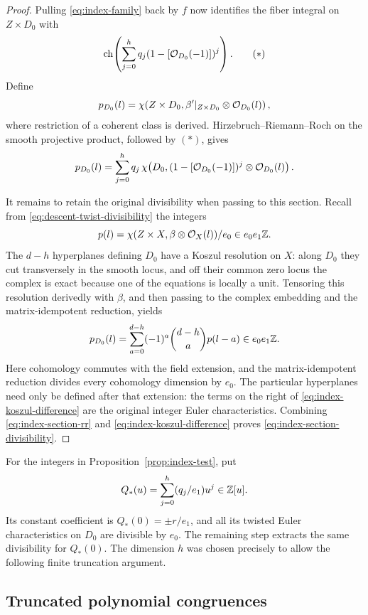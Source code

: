 \begin{proof}
Pulling \eqref{eq:index-family} back by \(f\) now identifies
the fiber integral on \(Z\times D_0\) with
\[
 \operatorname{ch}\!\left(
       \sum_{j=0}^h q_j(1-[\mathcal O_{D_0}(-1)])^j
     \right).
 \tag{\(\ast\)}
\]
Define
\[
 p_{D_0}(l)=
 \chi\!\left(Z\times D_0,
       \beta'|_{Z\times D_0}\otimes\mathcal O_{D_0}(l)\right),
\]
where restriction of a coherent class is derived.
Hirzebruch--Riemann--Roch on the smooth projective product, followed
by \((\ast)\), gives
\begin{equation}\label{eq:index-section-rr}
 p_{D_0}(l)=
 \sum_{j=0}^h q_j\,
 \chi\!\left(D_0,
       (1-[\mathcal O_{D_0}(-1)])^j\otimes\mathcal O_{D_0}(l)\right).
\end{equation}

It remains to retain the original divisibility when passing to
this section.  Recall from \eqref{eq:descent-twist-divisibility}
the integers
\[
 p(l)=\chi(Z\times X,\beta\otimes\mathcal O_X(l))/e_0
       \in e_0e_1\mathbb Z.
\]
The \(d-h\) hyperplanes defining \(D_0\) have a Koszul resolution
on \(X\): along \(D_0\) they cut transversely in the smooth locus,
and off their common zero locus the complex is exact because
one of the equations is locally a unit.
Tensoring this resolution derivedly with \(\beta\), and then
passing to the complex embedding and the matrix-idempotent
reduction, yields
\begin{equation}\label{eq:index-koszul-difference}
 p_{D_0}(l)
   =\sum_{a=0}^{d-h}(-1)^a\binom{d-h}{a}p(l-a)
   \in e_0e_1\mathbb Z.
\end{equation}
Here cohomology commutes with the field extension, and the
matrix-idempotent reduction divides every cohomology dimension by
\(e_0\).  The particular hyperplanes need only be defined after
that extension: the terms on the right of
\eqref{eq:index-koszul-difference} are the original integer Euler
characteristics.  Combining
\eqref{eq:index-section-rr} and \eqref{eq:index-koszul-difference}
proves \eqref{eq:index-section-divisibility}.
\end{proof}

For the integers in Proposition~\ref{prop:index-test}, put
\[
 Q_*(u)=\sum_{j=0}^h(q_j/e_1)u^j\in\mathbb Z[u].
\]
Its constant coefficient is \(Q_*(0)=\pm r/e_1\), and all its twisted
Euler characteristics on \(D_0\) are divisible by \(e_0\).
The remaining step extracts the same divisibility for \(Q_*(0)\).
The dimension \(h\) was chosen precisely to allow the following
finite truncation argument.

\subsection{Truncated polynomial congruences}

